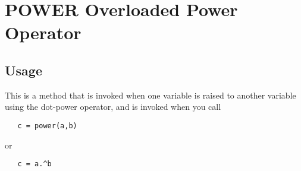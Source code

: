 \section{POWER Overloaded Power Operator}

\subsection{Usage}

This is a method that is invoked when one variable is raised
to another variable using the dot-power operator, and is
invoked when you call
\begin{verbatim}
   c = power(a,b)
\end{verbatim}
or
\begin{verbatim}
   c = a.^b
\end{verbatim}
